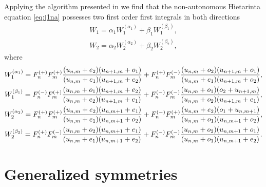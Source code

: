 \documentclass[pdftex]{sigma}
\numberwithin{equation}{section}
\begin{document}
Applying the algorithm presented in \cite{GSY_DarbouxI}
we f\/ind that the non-autonomous Hietarinta equation
\eqref{eq:j1na} possesses two f\/irst order f\/irst integrals
in both directions
\begin{subequations} \label{eq:j1nafint}
 \begin{gather*}
 W_{1} = \alpha_{1} W_{1}^{(\alpha_{1})}+\beta_{1} W_{1}^{(\beta_{1})}, \label{eq:j1naW1} \\
 W_{2} = \alpha_{2} W_{2}^{(\alpha_{2})}+\beta_{2} W_{2}^{(\beta_{2})}, \label{eq:j1naW2}
 \end{gather*}
\end{subequations}
where
 \begin{gather*}
 W_{1}^{(\alpha_{1})} =F_n^{(+)}F_m^{(+)}{\frac { ( u_{{n,m}}+e_2 )
 ( u_{{n+1,m}}+o_1) }{
 ( u_{{n,m}}+ e_1 )
 ( u_{{n+1,m}}+e_2 ) }}
 +F_n^{(+)}F_m^{(-)} {\frac { ( u_{{n,m}}+o_2 )
 ( u_{{n+1,m}}+o_1 ) }{%
 ( u_{{n,m}}+e_1 )
 ( u_{{n+1,m}} +o_{2}) }}, \label{eq:j1naW1a} \\
 W_{1}^{(\beta_{1})}=F_n^{(-)}F_m^{(+)} {\frac { ( u_{{n,m}}+o_1 )
 ( u_{{n+1,m}}+ e_2 ) }{
 ( u_{{n,m}}+e_2 )
 ( u_{{n+1,m}}+e_1 ) }}+F_n^{(-)}F_m^{(-)} {\frac { ( u_{{n,m}}+o_1 )
 ( o_2+u_{{n+1,m}} ) }{%
 ( u_{{n,m}}+ o_2 ) ( u_{{n+1,m}}+e_1 ) }}, \label{eq:j1naW1b} \\
 W_{2}^{(\alpha_{2})}
 =F_n^{(+)}F_m^{(+)} {\frac { ( u_{{n,m}}+e_2 )
 ( u_{{n,m+1}}+e_1 ) }{%
 ( u_{{n,m}}+e_1 )
 ( u_{{n,m+1}}+o_2 ) }}+F_n^{(-)}F_m^{(+)} {\frac { ( u_{{n,m}}+e_2 )
 ( o_1+u_{{n,m+1}} ) }{
 ( u_{{n,m}}+o_1 )
 ( u_{{n,m+1}}+o_2 ) }}, \label{eq:j1naW2a} \\
 W_{2}^{(\beta_{2})}
 =F_n^{(+)}F_m^{(-)} \frac { ( u_{{n,m}}+o_2 )
 ( u_{{n,m+1}}+e_1 ) }{
 ( u_{{n,m}}+e_1 )
 ( u_{{n,m+1}}+e_2 )}
 +F_n^{(-)}F_m^{(-)} {\frac { ( u_{{n,m}}+o_2 )
 ( u_{{n,m+1}}+o_{1} ) }{%
 ( u_{{n,m}}+o_{1} )
 ( u_{{n,m+1}}+ e_2 ) }}.
 \label{eq:j1naW2b}
 \end{gather*}

\section{Generalized symmetries}\label{sec:gensymm}
\end{document}
